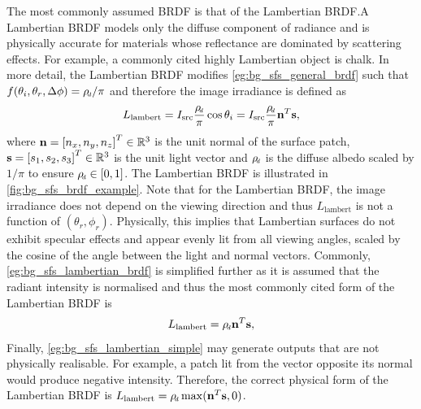 The most commonly assumed BRDF is that of the Lambertian BRDF.\@ A Lambertian
BRDF models only the diffuse component of radiance and is physically accurate
for materials whose reflectance are dominated by scattering effects. For
example, a commonly cited highly Lambertian object is chalk. In more
detail, the Lambertian BRDF modifies \cref{eg:bg_sfs_general_brdf} such that
$f(\theta_i,\theta_r, \Delta \phi) = \rho_{\smallsub{d}} / \pi$ and therefore
the image irradiance is defined as
\begin{equation}\label{eg:bg_sfs_lambertian_brdf}
	L_{\operatorname{lambert}} = I_{\operatorname{src}} \frac{\rho_{\smallsub{d}}}{\pi} \cos{\theta_i} =
	I_{\operatorname{src}} \frac{\rho_{\smallsub{d}}}{\pi} \bb{n}^T \bb{s},
\end{equation}
where $\boldsymbol{\mathbf{n}} = {[n_x, n_y, n_z]}^T \in \mathbb{R}^{3}$ is the unit normal of the surface patch,
$\boldsymbol{\mathbf{s}} = {[s_1, s_2, s_3]}^T \in \mathbb{R}^{3}$ is the unit
light vector and $\rho_{\smallsub{d}}$ is the diffuse albedo scaled by $1/\pi$
to ensure $\rho_{\smallsub{d}} \in [0, 1]$. The Lambertian BRDF is illustrated
in \cref{fig:bg_sfs_brdf_example}. Note that for the Lambertian BRDF, the image
irradiance does not depend on the viewing direction and thus
$L_{\operatorname{lambert}}$ is not a function of $(\theta_r,\phi_r)$.
Physically, this implies that Lambertian surfaces do not exhibit specular
effects and appear evenly lit from all viewing angles, scaled by the cosine
of the angle between the light and normal vectors. Commonly,
\cref{eg:bg_sfs_lambertian_brdf} is simplified further as it is assumed that the
radiant intensity is normalised and thus the most commonly cited form of the
Lambertian BRDF is
\begin{align}\label{eg:bg_sfs_lambertian_simple}
	L_{\operatorname{lambert}} = \rho_{\smallsub{d}} \bb{n}^T \bb{s},
\end{align}
Finally, \cref{eg:bg_sfs_lambertian_simple} may generate outputs that are
not physically realisable. For example, a patch lit from the vector opposite
its normal would produce negative intensity. Therefore, the correct physical
form of the Lambertian BRDF is
$L_{\operatorname{lambert}} = \rho_{\smallsub{d}} \max(\bb{n}^T \bb{s}, 0)$.
